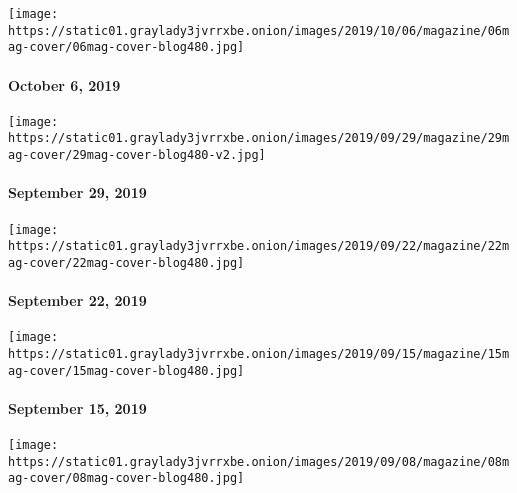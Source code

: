 \href{https://www.nytimes3xbfgragh.onion/issue/magazine/2019/10/04/the-10619-issue}{}

\texttt{[image: https://static01.graylady3jvrrxbe.onion/images/2019/10/06/magazine/06mag-cover/06mag-cover-blog480.jpg]}

\hypertarget{october-6-2019}{%
\paragraph{October 6, 2019}\label{october-6-2019}}

\href{https://www.nytimes3xbfgragh.onion/interactive/2019/09/24/magazine/adventure-archive-photos.html}{}

\texttt{[image: https://static01.graylady3jvrrxbe.onion/images/2019/09/29/magazine/29mag-cover/29mag-cover-blog480-v2.jpg]}

\hypertarget{september-29-2019}{%
\paragraph{September 29, 2019}\label{september-29-2019}}

\href{https://www.nytimes3xbfgragh.onion/issue/magazine/2019/09/20/the-92219-issue}{}

\texttt{[image: https://static01.graylady3jvrrxbe.onion/images/2019/09/22/magazine/22mag-cover/22mag-cover-blog480.jpg]}

\hypertarget{september-22-2019}{%
\paragraph{September 22, 2019}\label{september-22-2019}}

\href{https://www.nytimes3xbfgragh.onion/issue/magazine/2019/09/13/the-91519-issue}{}

\texttt{[image: https://static01.graylady3jvrrxbe.onion/images/2019/09/15/magazine/15mag-cover/15mag-cover-blog480.jpg]}

\hypertarget{september-15-2019}{%
\paragraph{September 15, 2019}\label{september-15-2019}}

\href{https://www.nytimes3xbfgragh.onion/issue/magazine/2019/09/05/the-9819-issue}{}

\texttt{[image: https://static01.graylady3jvrrxbe.onion/images/2019/09/08/magazine/08mag-cover/08mag-cover-blog480.jpg]}

